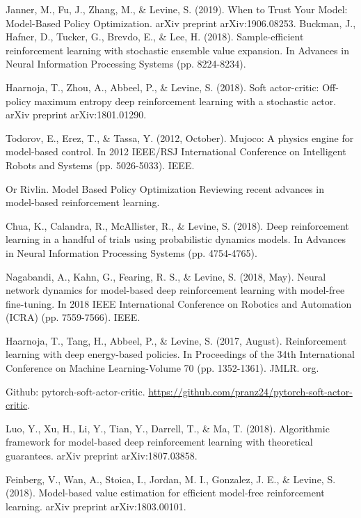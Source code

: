 \documentclass{article}
\begin{document}
\newpage
\small
\begin{thebibliography}{99}
 Janner, M., Fu, J., Zhang, M., \& Levine, S. (2019). When to Trust Your Model: Model-Based Policy Optimization. arXiv preprint arXiv:1906.08253. 
 Buckman, J., Hafner, D., Tucker, G., Brevdo, E., \& Lee, H. (2018). Sample-efficient reinforcement learning with stochastic ensemble value expansion. In Advances in Neural Information Processing Systems (pp. 8224-8234). 

 Haarnoja, T., Zhou, A., Abbeel, P., \& Levine, S. (2018). Soft actor-critic: Off-policy maximum entropy deep reinforcement learning with a stochastic actor. arXiv preprint arXiv:1801.01290. 

 Todorov, E., Erez, T., \& Tassa, Y. (2012, October). Mujoco: A physics engine for model-based control. In 2012 IEEE/RSJ International Conference on Intelligent Robots and Systems (pp. 5026-5033). IEEE. 

 Or Rivlin. Model Based Policy Optimization {\small Reviewing recent advances in model-based reinforcement learning.}

 Chua, K., Calandra, R., McAllister, R., \& Levine, S. (2018). Deep reinforcement learning in a handful of trials using probabilistic dynamics models. In Advances in Neural Information Processing Systems (pp. 4754-4765).

 Nagabandi, A., Kahn, G., Fearing, R. S., \& Levine, S. (2018, May). Neural network dynamics for model-based deep reinforcement learning with model-free fine-tuning. In 2018 IEEE International Conference on Robotics and Automation (ICRA) (pp. 7559-7566). IEEE.

 Haarnoja, T., Tang, H., Abbeel, P., \& Levine, S. (2017, August). Reinforcement learning with deep energy-based policies. In Proceedings of the 34th International Conference on Machine Learning-Volume 70 (pp. 1352-1361). JMLR. org.

 Github: pytorch-soft-actor-critic. \url{https://github.com/pranz24/pytorch-soft-actor-critic}.

 Luo, Y., Xu, H., Li, Y., Tian, Y., Darrell, T., \& Ma, T. (2018). Algorithmic framework for model-based deep reinforcement learning with theoretical guarantees. arXiv preprint arXiv:1807.03858.

 Feinberg, V., Wan, A., Stoica, I., Jordan, M. I., Gonzalez, J. E., \& Levine, S. (2018). Model-based value estimation for efficient model-free reinforcement learning. arXiv preprint arXiv:1803.00101.
\end{thebibliography}
\end{document}
